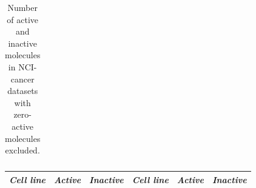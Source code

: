 \documentclass[english]{tktltiki}
\begin{document}
\begin{center}
\begin{table}
\begin{tabular}{|c|c|c||c|c|c|}
\end{tabular}
\caption[NCI-cancer dataset with zero-active molecules excluded.]{Number of active and inactive molecules in NCI-cancer datasets with zero-active molecules excluded.}
\label{cancer_statistics_1}
\end{table}
\end{center}

\begin{center}
\begin{table}
\centering
\begin{tabular}{|c|c|c||c|c|c|}\hline
\textbf{\em Cell line}	&\textbf{\em Active}	&\textbf{\em Inactive}	&\textbf{\em Cell line}	&\textbf{\em Active}	&\textbf{\em Inactive}	\\ \hline \hline


\end{tabular}
\end{table}
\end{center}
\end{document}
